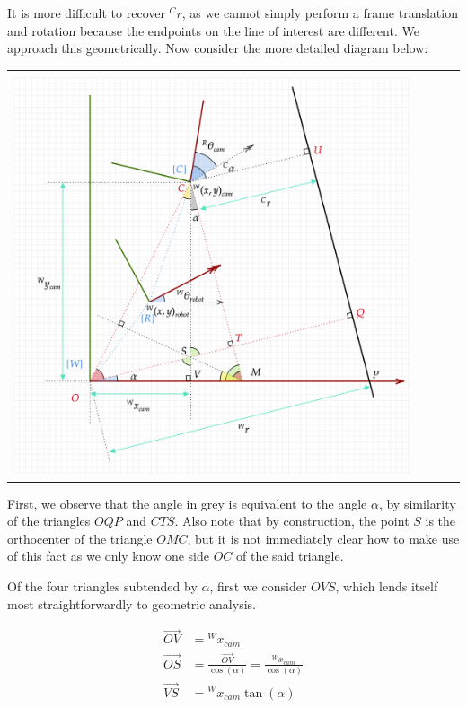 \documentclass{article}
\begin{document}
\begin{enumerate}[label=(\roman*)]
\pagebreak

It is more difficult to recover ${}^C r$, as we cannot simply perform a frame translation and rotation because the endpoints on the line of interest are different. We approach this geometrically. Now consider the more detailed diagram below:

\begin{tabular}[t]{l}
	\hline \\
	\includegraphics[width=0.9\textwidth]{img/diagram-2.png} \\
	\hline
\end{tabular}

First, we observe that the angle in grey is equivalent to the angle $\alpha$, by similarity of the triangles $OQP$ and $CTS$. Also note that by construction, the point $S$ is the orthocenter of the triangle $OMC$, but it is not immediately clear how to make use of this fact as we only know one side $OC$ of the said triangle.

Of the four triangles subtended by $\alpha$, first we consider $OVS$, which lends itself most straightforwardly to geometric analysis.

\begin{equation}
\begin{aligned}
\overrightarrow{OV}
&= {}^W x_{cam} \\
\overrightarrow{OS}
&= \frac{\overrightarrow{OV}}{\cos(\alpha)} = \frac{{}^W x_{cam}}{\cos(\alpha)} \\
\overrightarrow{VS}
&= {}^W x_{cam} \tan(\alpha) \\
\end{aligned}
\end{equation}


\end{enumerate}
\end{document}
